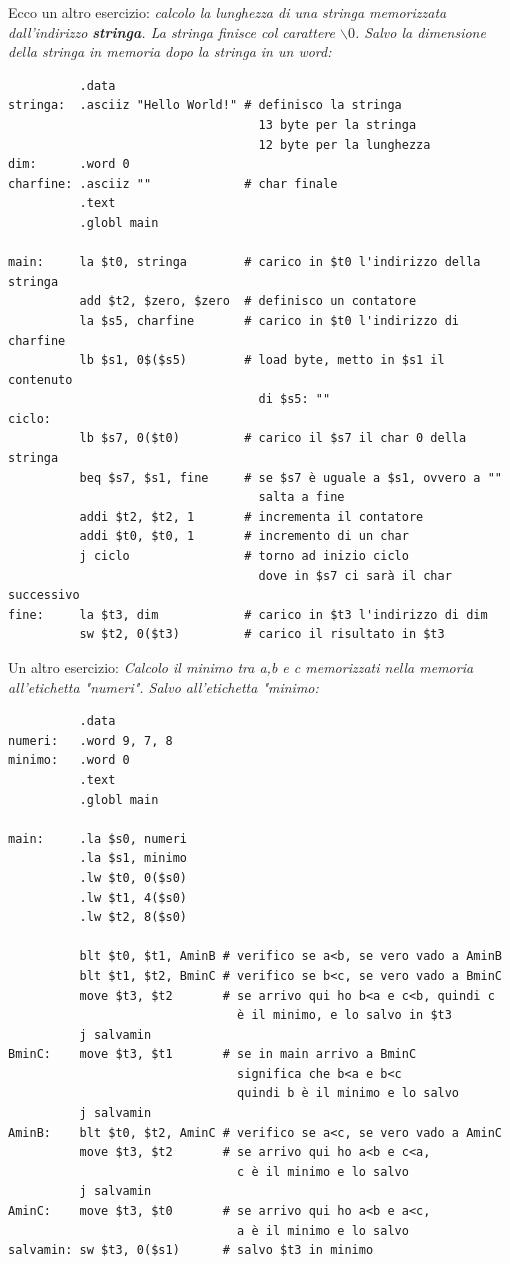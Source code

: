\documentclass[a4paper,12pt, oneside]{book}
\begin{document}
Ecco un altro esercizio:
\textit{calcolo la lunghezza di una stringa memorizzata dall'indirizzo \textbf{stringa}. La stringa finisce col carattere $\backslash 0$. Salvo la dimensione della stringa in memoria dopo la stringa in un word:}
\begin{verbatim}
          .data
stringa:  .asciiz "Hello World!" # definisco la stringa
                                   13 byte per la stringa
                                   12 byte per la lunghezza
dim:      .word 0
charfine: .asciiz ""             # char finale
          .text
          .globl main
        
main:     la $t0, stringa        # carico in $t0 l'indirizzo della stringa
          add $t2, $zero, $zero  # definisco un contatore
          la $s5, charfine       # carico in $t0 l'indirizzo di charfine
          lb $s1, 0$($s5)        # load byte, metto in $s1 il contenuto
                                   di $s5: ""
ciclo:
          lb $s7, 0($t0)         # carico il $s7 il char 0 della stringa
          beq $s7, $s1, fine     # se $s7 è uguale a $s1, ovvero a ""
                                   salta a fine
          addi $t2, $t2, 1       # incrementa il contatore
          addi $t0, $t0, 1       # incremento di un char
          j ciclo                # torno ad inizio ciclo
                                   dove in $s7 ci sarà il char successivo
fine:     la $t3, dim            # carico in $t3 l'indirizzo di dim
          sw $t2, 0($t3)         # carico il risultato in $t3
\end{verbatim}
Un altro esercizio:
\textit{Calcolo il minimo tra a,b e c memorizzati nella memoria all'etichetta "numeri". Salvo all'etichetta "minimo:}
\begin{verbatim}
          .data
numeri:   .word 9, 7, 8
minimo:   .word 0
          .text
          .globl main
          
main:     .la $s0, numeri
          .la $s1, minimo
          .lw $t0, 0($s0)
          .lw $t1, 4($s0)
          .lw $t2, 8($s0)
          
          blt $t0, $t1, AminB # verifico se a<b, se vero vado a AminB
          blt $t1, $t2, BminC # verifico se b<c, se vero vado a BminC
          move $t3, $t2       # se arrivo qui ho b<a e c<b, quindi c 
                                è il minimo, e lo salvo in $t3
          j salvamin
BminC:    move $t3, $t1       # se in main arrivo a BminC
                                significa che b<a e b<c
                                quindi b è il minimo e lo salvo
          j salvamin
AminB:    blt $t0, $t2, AminC # verifico se a<c, se vero vado a AminC
          move $t3, $t2       # se arrivo qui ho a<b e c<a,
                                c è il minimo e lo salvo
          j salvamin
AminC:    move $t3, $t0       # se arrivo qui ho a<b e a<c,
                                a è il minimo e lo salvo       
salvamin: sw $t3, 0($s1)      # salvo $t3 in minimo
\end{verbatim}
\end{document}
